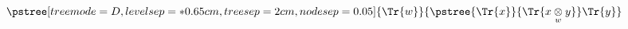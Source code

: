 $\displaystyle
\pstree[treemode=\CItreemode,levelsep=*0.65cm,treesep=\CItreesep,nodesep=0.05]
{
	\Tr{w}
}
{
   \pstree
	{
	   \Tr{x}
	}
	{
		\Tr{\crossx{x}{y}{w}\nudgeup{0.5cm}} 
	}
	\Tr{y}
}
$